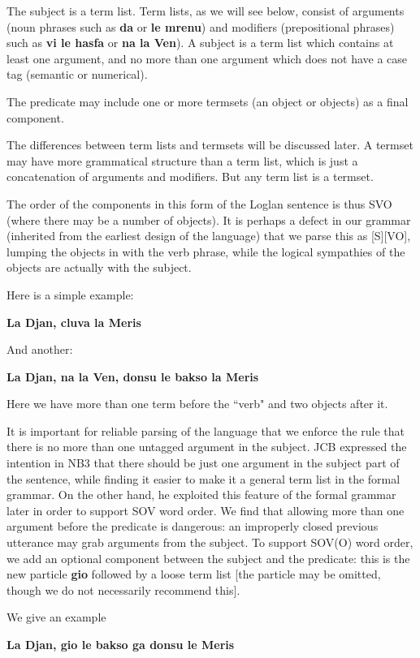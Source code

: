 \documentclass[12pt]{book}
\begin{document}
{The subject is a term list.  Term lists, as we will see below, consist of arguments (noun phrases such as {\bf da} or {\bf le mrenu}) and modifiers (prepositional phrases) such as {\bf vi le hasfa} or {\bf na la Ven}).  A subject is a term list which contains at least one argument, and no more than one argument which does not have a case tag (semantic or numerical).  

The predicate may include one or more termsets (an object or objects) as a final component.

The differences between term lists and termsets will be discussed later.  A termset may have more grammatical structure than a term list, which
is just a concatenation of arguments and modifiers.  But any term list is a termset.

The order of the components in this form of the Loglan sentence is thus SVO (where there may be a number of objects).  It is perhaps a defect in our grammar
(inherited from the earliest design of the language) that we parse this as [S][VO], lumping the objects in with the verb phrase, while the logical sympathies of the objects are actually with the subject.

Here is a simple example:

{\bf La Djan, cluva la Meris}

And another:

{\bf La Djan, na la Ven, donsu le bakso la Meris}

Here we have more than one term before the ``verb" and two objects after it.

It is important for reliable parsing of the language that we enforce the rule that there is no more than one untagged argument in the subject.  JCB
expressed the intention in NB3 that there should be just one argument in the subject part of the sentence, while finding it easier to make it a general term list in the formal  grammar.  On the other hand, he exploited this feature of the formal grammar  later in order to support SOV word order.  We find that allowing more than one argument
before the predicate is dangerous:  an improperly closed previous utterance may grab arguments from the subject.  To support SOV(O) word order,
we add an optional component between the subject and the predicate:  this is the new particle {\bf gio} followed by a loose term list [the particle may be omitted, though we do not necessarily recommend this].

We give an example

{\bf La Djan, gio le bakso ga donsu le Meris}

}
\end{document}
